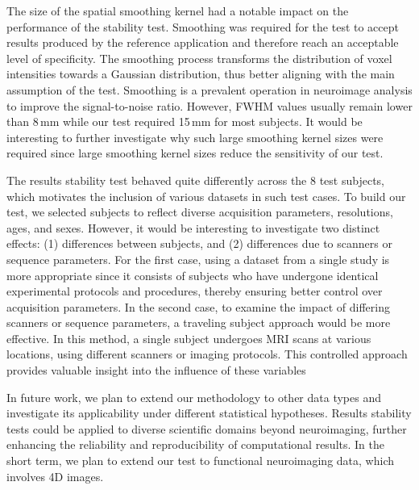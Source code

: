 \documentclass[lettersize,journal]{IEEEtran}
\begin{document}
{%
The size of the spatial smoothing kernel had a notable impact on the performance of the stability test. Smoothing was required for the test to accept results produced by the reference application and therefore reach an acceptable level of specificity.
The smoothing process transforms the distribution of voxel intensities towards a Gaussian distribution, thus better aligning with the main assumption of the test.
Smoothing is a prevalent operation in neuroimage analysis to improve the signal-to-noise ratio. However, FWHM values usually remain lower than 8\,mm while our test required 15\,mm for most subjects. It would be interesting to further investigate why such large smoothing kernel sizes were required since large smoothing kernel sizes reduce the sensitivity of our test.

The results stability test behaved quite differently across the 8 test subjects, which motivates the inclusion of various datasets in such test cases.
To build our test, we selected subjects to reflect diverse acquisition parameters, resolutions, ages, and sexes.
However, it would be interesting to investigate two distinct effects: (1) differences between subjects, and (2) differences due to scanners or sequence parameters. For the first case, using a dataset from a single study is more appropriate since it consists of subjects who have undergone identical experimental protocols and procedures, thereby ensuring better control over acquisition parameters.
In the second case, to examine the impact of differing scanners or sequence parameters, a traveling subject approach would be more effective. In this method, a single subject undergoes MRI scans at various locations, using different scanners or imaging protocols. This controlled approach provides valuable insight into the influence of these variables


In future work, we plan to extend our methodology to other data types and investigate its applicability under different statistical hypotheses.
Results stability tests could be applied to diverse scientific domains beyond neuroimaging, further enhancing the reliability and reproducibility of computational results. In the short term, we plan to extend our test to functional neuroimaging data, which involves 4D images.


}
\end{document}
